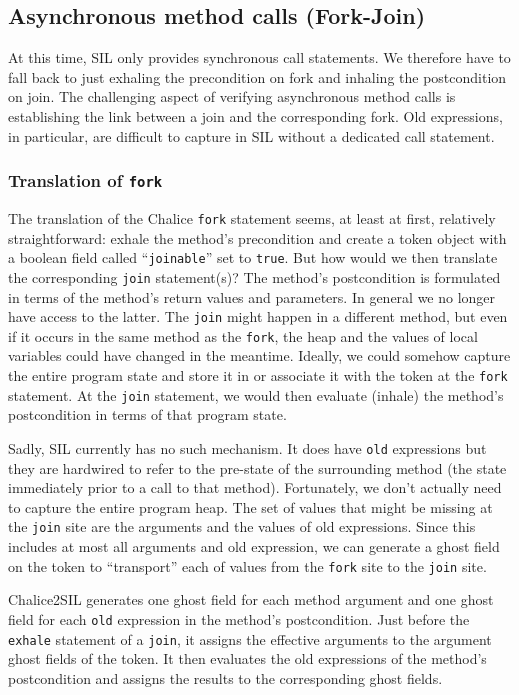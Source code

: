 \subsection{Asynchronous method calls (Fork-Join)}\label{sct:fj}
At this time, SIL only provides synchronous call statements. 
We therefore have to fall back to just exhaling the precondition on fork and inhaling the postcondition on join. 
The challenging aspect of verifying asynchronous method calls is establishing the link between a join and the corresponding fork.
Old expressions, in particular, are difficult to capture in SIL without a dedicated call statement.

\subsubsection{Translation of \lstinline!fork!}\label{sct:fjfork}

The translation of the Chalice \lstinline!fork! statement seems, at least at first, relatively straightforward: exhale the method's precondition and create a token object with a boolean field called ``\lstinline!joinable!'' set to \lstinline!true!.
But how would we then translate the corresponding \lstinline!join! statement(s)? The method's postcondition is formulated in terms of the method's return values and parameters.
In general we no longer have access to the latter.
The \lstinline!join! might happen in a different method, but even if it occurs in the same method as the \lstinline!fork!, the heap and the values of local variables could have changed in the meantime.
Ideally, we could somehow capture the entire program state and store it in or associate it with the token at the \lstinline!fork! statement.
At the \lstinline!join! statement, we would then evaluate (inhale) the method's postcondition in terms of that program state.

Sadly, SIL currently has no such mechanism. 
It does have \lstinline[language=SIL]!old! expressions but they are hardwired to refer to the pre-state of the surrounding method (the state immediately prior to a call to that method).
Fortunately, we don't actually need to capture the entire program heap. 
The set of values that might be missing at the \lstinline!join! site are the arguments and the values of old expressions. 
Since this includes at most all arguments and old expression, we can generate a ghost field on the token to ``transport'' each of values from the \lstinline!fork! site to the \lstinline!join! site.

Chalice2SIL generates one ghost field for each method argument and one ghost field for each \lstinline!old! expression in the method's postcondition. 
Just before the \lstinline!exhale! statement of a \lstinline!join!, it assigns the effective arguments to the argument ghost fields of the token. It then evaluates the old expressions of the method's postcondition and assigns the results to the corresponding ghost fields. 

